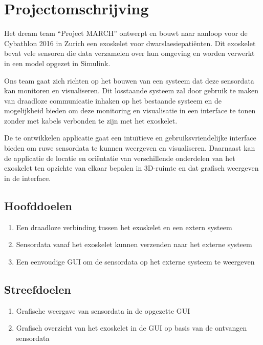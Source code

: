 \section{Projectomschrijving}
Het dream team ``Project MARCH'' ontwerpt en bouwt naar aanloop voor de Cybathlon 2016 in Zurich een exoskelet voor dwarslaesiepatiënten. Dit exoskelet bevat vele sensoren die data verzamelen over hun omgeving en worden verwerkt in een model opgezet in Simulink.

Ons team gaat zich richten op het bouwen van een systeem dat deze sensordata kan monitoren en visualiseren. Dit losstaande systeem zal door gebruik te maken van draadloze communicatie inhaken op het bestaande systeem en de mogelijkheid bieden om deze monitoring en visualisatie in een interface te tonen zonder met kabels verbonden te zijn met het exoskelet.

De te ontwikkelen applicatie gaat een intuïtieve en gebruiksvriendelijke interface bieden om ruwe sensordata te kunnen weergeven en visualiseren. Daarnaast kan de applicatie de locatie en oriëntatie van verschillende onderdelen van het exoskelet ten opzichte van elkaar bepalen in 3D-ruimte en dat grafisch weergeven in de interface.
\subsection{Hoofddoelen}
\begin{enumerate}
 \item Een draadloze verbinding tussen het exoskelet en een extern systeem
 \item Sensordata vanaf het exoskelet kunnen verzenden naar het externe systeem
 \item Een eenvoudige GUI om de sensordata op het externe systeem te weergeven
\end{enumerate}
\subsection{Streefdoelen}
\begin{enumerate}
 \item Grafische weergave van sensordata in de opgezette GUI
 \item Grafisch overzicht van het exoskelet in de GUI op basis van de ontvangen sensordata
\end{enumerate}

